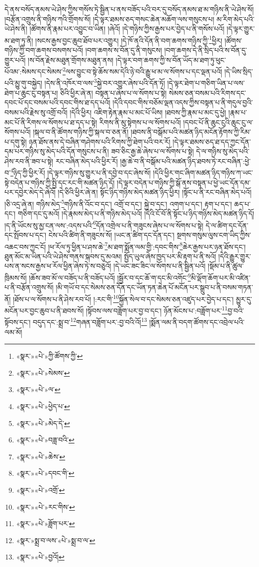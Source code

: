 དེ་ནས་བསོད་ནམས་ཡེ་ཤེས་ཀྱིས་གསོས་ཏེ་སྦྱིན་པ་ནས་བཟོད་པའི་བར་དུ་བསོད་ནམས་ཐ་མ་གཉིས་ནི་ཡེ་ཤེས་སོ། །བརྩོན་འགྲུས་ནི་གཉིས་ཀའི་གྲོགས་སོ། །དེ་ལྟར་ཐམས་ཅད་གསང་ཆེན་མཆོག་ལས་གསུངས་པ། མ་རིག་མེད་པའི་ཡེ་ཤེས་ནི། །ཚོགས་ནི་རྣམ་པར་འབྱུང་བ་ཡིན། །ཞེའོ། །དེ་གཉིས་ཀྱིས་རྒྱས་པར་བྱེད་པ་ནི་གསོས་པའོ། །དེ་ལྟར་གྱུར་མ་ཐག་ཏུ་ནི། །སངས་རྒྱས་བྱང་ཆུབ་ཐོབ་པར་འགྱུར། །དེ་ཁོ་ནའི་དོན་ནི་བག་ཆགས་གཉིས་ཀྱི་\footnote{«སྣར་»«པེ་»ཀྱི་ཚོགས་ཀྱི་}ཕྱིར། །ཚོགས་གཉིས་ཀྱི་བག་ཆགས་བསགས་པའོ། །བག་ཆགས་ས་བོན་དུ་ནི་གསུངས། །བག་ཆགས་དེ་ནི་སྲིད་པའི་ས་བོན་དུ་གྱུར་པའོ། །ས་བོན་རྗེས་མཐུན་གྲོགས་མཐུན་ནས། །དེ་ལྟར་བག་ཆགས་ཀྱི་ས་བོན་ཡོད་མ་ཐག་ཏུ་ཕུང་པོའམ་:སེམས་དང་སེམས་\footnote{«སྣར་»«པེ་»སེམས་}ལས་བྱུང་བ་སྟེ་ཆོས་སམ་དེའི་ཉེ་བའི་རྒྱུ་ཕ་མ་ལ་སོགས་པ་དང་ལྡན་པའོ། །དེ་ཡིས་སྲིད་པའི་མྱུ་གུ་བསྐྱེད། །དེས་ནི་འཁོར་བ་ལས་\footnote{«སྣར་»«པེ་»ལ་}སྐྱེ་བར་འགྱུར་ཞེས་པའི་དོན་ཏོ། །དེ་ལྟར་ཐེག་པ་གཅིག་ཡིན་པ་ལས་ཐེག་པ་ཆུང་ངུ་བསྟན་པ། ཅིའི་ཕྱིར་ཞེ་ན། བསྟན་པ་ཞེས་པ་ལ་སོགས་པ་སྟེ། སེམས་ཅན་བསམ་པའི་རིགས་དང་དབང་པོ་དང་བསམ་པའི་དབང་གིས་ཐ་དད་པའོ། །དེའི་དབང་གིས་བཅོམ་ལྡན་འདས་ཀྱིས་བསྟན་པ་ནི་གདུལ་བྱའི་བསམ་པའི་རྗེས་སུ་འགྲོ་བའོ། །དེའི་ཕྱིར། འཇིག་རྟེན་རྣམ་པ་མང་པོ་ཡིས། །ཐབས་ཀྱི་རྣམ་པ་མང་དུ་ཕྱེ། །རྣམ་པ་མང་པོ་ནི་རིགས་ལ་སོགས་པ་ཐ་དད་པ་སྟེ། རིགས་ནི་མུ་སྟེགས་པ་ལ་སོགས་པའོ། །དབང་པོ་ནི་ཆུང་ངུའི་ཆུང་ངུ་ལ་སོགས་པའོ། །སྐལ་བ་ནི་ཚོགས་གཉིས་ཀྱི་སྐལ་བ་ཅན་ནོ། །ཐབས་ནི་བསྒོམ་པའི་མཚན་ཉིད་མངོན་རྟོགས་ཀྱི་རིམ་པ་དགུ་སྟེ། ཉན་ཐོས་ནས་དེ་བཞིན་གཤེགས་པའི་རིགས་ཀྱི་ཐེག་པའི་བར་རོ། །དེ་ལྟར་ཐམས་ཅད་ཐ་དད་ཀྱང་དོན་དམ་པར་གཉིས་སུ་མེད་པའི་དོན་གསུངས་པ་ནི། ཟབ་ཅིང་རྒྱ་ཆེ་ཞེས་པ་ལ་སོགས་པ་སྟེ། དེ་ལ་གཉིས་སུ་མེད་པའི་ཤེས་རབ་ནི་ཟབ་པ་སྟེ། རང་བཞིན་མེད་པའི་ཕྱིར་རོ། །རྒྱ་ཆེ་བ་ནི་བསྒོམ་པའི་མཚན་ཉིད་ཐབས་ཏེ་རང་བཞིན་:ཕྱེ་བ་\footnote{«སྣར་»«པེ་»ཕྱེད་པ་}ཉིད་ཀྱི་ཕྱིར་རོ། །དེ་ལྟར་གཉིས་སུ་གྱུར་པ་ནི་དབྱེ་བ་དང་ཞེས་སོ། །དེའི་ཕྱིར་གང་ཞིག་མཚན་ཉིད་གཉིས་ཀ་ཡང་སྟེ་བདེན་པ་གཉིས་ཀྱི་སྤྱི་དང་རང་གི་མཚན་ཉིད་དོ། །དེ་ལྟར་བདེན་པ་གཉིས་ཀྱི་སྒོ་ནས་བསྟན་པ་ཕྱེ་ཡང་དོན་དམ་པར་དབྱེར་མེད་དེ་ཞེའོ། །དེ་ཅིའི་ཕྱིར་ཞེ་ན། སྟོང་ཉིད་གཉིས་མེད་མཚན་ཉིད་ཕྱིར། །སྟོང་པ་ནི་རང་བཞིན་མེད་པའོ། །ཅི་འདྲ་ཞེ་ན། གཉིས་མེད་\footnote{«སྣར་»«པེ་»མེད་དེ་}གཉིས་ནི་འོང་བ་དང་། འགྲོ་བ་དང་། སྐྱེ་བ་དང་། འགག་པ་དང་། རྟག་པ་དང་། ཆད་པ་དང་། གཅིག་དང་དུ་མའོ། །དེ་རྣམས་མེད་པ་ནི་གཉིས་མེད་པའོ། །དེའི་ངོ་བོ་ནི་སྟོང་པ་ཉིད་གཉིས་མེད་མཚན་ཉིད་དོ། །ད་ནི་ཡོངས་སུ་མྱ་ངན་ལས་:འདས་པའི་\footnote{«སྣར་»«པེ་»བཟླ་བའི་}དོན་འགྲེལ་པ་ནི་གཟུངས་ཞེས་པ་ལ་སོགས་པ་སྟེ། དེ་ལ་ཚིག་དང་དོན་དང་སྤོབས་པ་དང་། ངེས་པའི་ཚིག་ནི་གཟུངས་སོ། །ཡང་ན་ཚིག་དང་དོན་དང་། སྔགས་གསུམ་ལུས་ངག་ཡིད་ཀྱིས་འཆང་བས་ཀྱང་ངོ། །ཕ་རོལ་ཏུ་ཕྱིན་པ་ཤས་ཆེ་\footnote{«སྣར་»«པེ་»ཆེས་}མ་ཐག་སྨོན་ལམ་གྱི་:དབང་གིས་\footnote{«སྣར་»«པེ་»དབང་གི་}ཆེར་རྒྱས་པར་ཉན་ཐོས་དང་། ཐུན་མོང་མ་ཡིན་པའི་ཡེ་ཤེས་གནས་སྐབས་དུ་མའམ། སྤྱོད་ཡུལ་ཞེས་ཁྱད་པར་མི་རྟག་པ་ནི་སའོ། །དེའི་རྒྱུར་གྱུར་པས་ན་སངས་རྒྱས་ཕ་རོལ་ཕྱིན་ཞེས་ཏེ་ས་བཅུའོ། །དེ་ཡང་ཟང་ཟིང་ལ་སོགས་པ་ནི་སྦྱིན་པའོ། །སྡོམ་པ་ནི་ཚུལ་ཁྲིམས་སོ། །ཆོས་ཟབ་མོ་ལ་བཟོད་པ་ནི་བཟོད་པའོ། །སྦྱོར་བ་དང་ཆོ་ག་དང་མི་འགོང་\footnote{«སྣར་»«པེ་»འགྲོ་}མི་ལྡོག་ཆོག་པར་མི་འཛིན་པ་ནི་བརྩོན་འགྲུས་སོ། །མི་གཡོ་བ་དང་སེམས་ཅན་དོན་དང་ཡོན་ཏན་ཆེན་པོ་མངོན་པར་སྒྲུབ་པ་ནི་བསམ་གཏན་ནོ། །ཐོས་པ་ལ་སོགས་པ་ནི་ཤེས་རབ་པོ། །:རང་གི་\footnote{«སྣར་»«པེ་»རང་གིས་}སྐྱོན་སེལ་བ་དང་སེམས་ཅན་འཛུད་པར་བྱེད་པ་དང་། མྱུར་དུ་མངོན་པར་བྱང་ཆུབ་པ་ནི་ཐབས་སོ། །སྟོབས་ལས་བཟློག་པར་བྱ་བ་དང་། ཉོན་མོངས་པ་:བཟློག་པར་\footnote{«སྣར་»«པེ་»ཟློག་པར་}བྱ་བའི་སྟོབས་དང་། བདུད་དང་:སྨྲ་བ་\footnote{«སྣར་»སྨྲ་བ་ལས་«པེ་»སྨྲ་བ་ལ་}གཞན་བཟློག་པར་:བྱ་བའི་འོ།\footnote{«སྣར་»«པེ་»བྱའོ།} །སྨོན་ལམ་ནི་བདག་ཚོགས་དང་འབྲེལ་པའི་ལམ་མོ། 